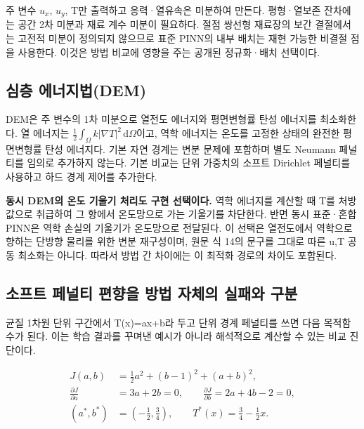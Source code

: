 \documentclass[10pt,a4paper]{article}
\begin{document}
주 변수 $u_x$, $u_y$, T만 출력하고 응력·열유속은 미분하여 만든다. 평형·열보존 잔차에는 공간 2차 미분과 재료 계수 미분이 필요하다. 절점 쌍선형 재료장의 보간 결절에서는 고전적 미분이 정의되지 않으므로 표준 PINN의 내부 배치는 재현 가능한 비결절 점을 사용한다. 이것은 방법 비교에 영향을 주는 공개된 정규화·배치 선택이다.\par

\subsection{심층 에너지법(DEM)}

DEM은 주 변수의 1차 미분으로 열전도 에너지와 평면변형률 탄성 에너지를 최소화한다. 열 에너지는 $\frac12\int_\Omega k|\nabla T|^2\,\mathrm d\Omega$이고, 역학 에너지는 온도를 고정한 상태의 완전한 평면변형률 탄성 에너지다. 기본 자연 경계는 변분 문제에 포함하며 별도 Neumann 페널티를 임의로 추가하지 않는다. 기본 비교는 단위 가중치의 소프트 Dirichlet 페널티를 사용하고 하드 경계 제어를 추가한다.\par

{\small\color{muted} \textbf{동시 DEM의 온도 기울기 처리도 구현 선택이다.} 역학 에너지를 계산할 때 T를 처방값으로 취급하여 그 항에서 온도망으로 가는 기울기를 차단한다. 반면 동시 표준·혼합 PINN은 역학 손실의 기울기가 온도망으로 전달된다. 이 선택은 열전도에서 역학으로 향하는 단방향 물리를 위한 변분 재구성이며, 원문 식 14의 문구를 그대로 따른 u,T 공동 최소화는 아니다. 따라서 방법 간 차이에는 이 최적화 경로의 차이도 포함된다.\par}

\subsection{소프트 페널티 편향을 방법 자체의 실패와 구분}

균질 1차원 단위 구간에서 T(x)=ax+b라 두고 단위 경계 페널티를 쓰면 다음 목적함수가 된다. 이는 학습 결과를 꾸며낸 예시가 아니라 해석적으로 계산할 수 있는 비교 진단이다.\par

\begin{equation}\begin{aligned}J(a,b)&=\tfrac12a^2+(b-1)^2+(a+b)^2,\\\frac{\partial J}{\partial a}&=3a+2b=0,\qquad \frac{\partial J}{\partial b}=2a+4b-2=0,\\(a^*,b^*)&=\left(-\tfrac12,\tfrac34\right),\qquad T^*(x)=\tfrac34-\tfrac12x.\end{aligned}\end{equation}
\end{document}
